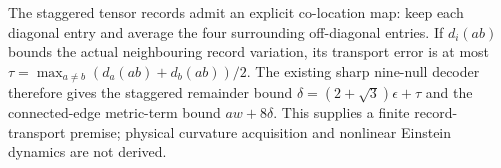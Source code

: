 The staggered tensor records admit an explicit co-location map: keep each
diagonal entry and average the four surrounding off-diagonal entries.
If $d_i(ab)$ bounds the actual neighbouring record variation, its transport
error is at most $\tau=\max_{a\ne b}(d_a(ab)+d_b(ab))/2$.
The existing sharp nine-null decoder therefore gives the staggered remainder
bound $\delta=(2+\sqrt3)\epsilon+\tau$ and the connected-edge metric-term
bound $a w+8\delta$. This supplies a finite record-transport premise;
physical curvature acquisition and nonlinear Einstein dynamics are not derived.
